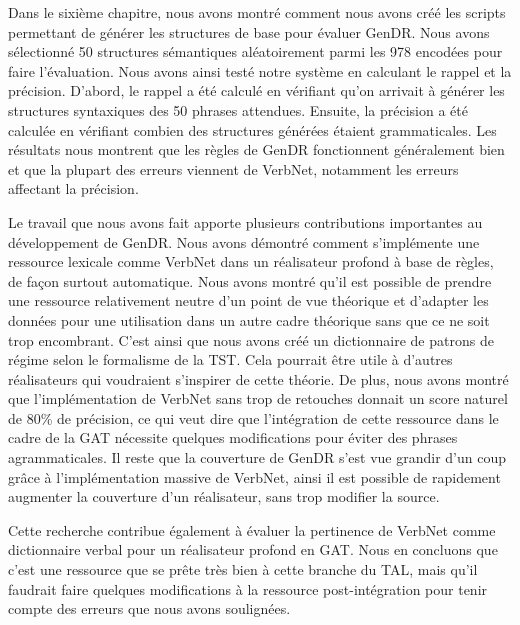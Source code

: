 Dans le sixième chapitre, nous avons montré comment nous avons créé les scripts permettant de générer les structures de base pour évaluer GenDR. Nous avons sélectionné 50 structures sémantiques aléatoirement parmi les 978 encodées pour faire l'évaluation. Nous avons ainsi testé notre système en calculant le rappel et la précision. D'abord, le rappel a été calculé en vérifiant qu'on arrivait à générer les structures syntaxiques des 50 phrases attendues. Ensuite, la précision a été calculée en vérifiant combien des structures générées étaient grammaticales. Les résultats nous montrent que les règles de GenDR fonctionnent généralement bien et que la plupart des erreurs viennent de VerbNet, notamment les erreurs affectant la précision.

Le travail que nous avons fait apporte plusieurs contributions importantes au développement de GenDR. Nous avons démontré comment s'implémente une ressource lexicale comme VerbNet dans un réalisateur profond à base de règles, de façon surtout automatique. Nous avons montré qu'il est possible de prendre une ressource relativement neutre d'un point de vue théorique et d'adapter les données pour une utilisation dans un autre cadre théorique sans que ce ne soit trop encombrant. C'est ainsi que nous avons créé un dictionnaire de patrons de régime selon le formalisme de la \ac{TST}. Cela pourrait être utile à d'autres réalisateurs qui voudraient s'inspirer de cette théorie. De plus, nous avons montré que l'implémentation de VerbNet sans trop de retouches donnait un score naturel de 80\% de précision, ce qui veut dire que l'intégration de cette ressource dans le cadre de la \ac{GAT} nécessite quelques modifications pour éviter des phrases agrammaticales. Il reste que la couverture de GenDR s'est vue grandir d'un coup grâce à l'implémentation massive de VerbNet, ainsi il est possible de rapidement augmenter la couverture d'un réalisateur, sans trop modifier la source. 

Cette recherche contribue également à évaluer la pertinence de VerbNet comme dictionnaire verbal pour un réalisateur profond en \ac{GAT}. Nous en concluons que c'est une ressource que se prête très bien à cette branche du \ac{TAL}, mais qu'il faudrait faire quelques modifications à la ressource post-intégration pour tenir compte des erreurs que nous avons soulignées.

